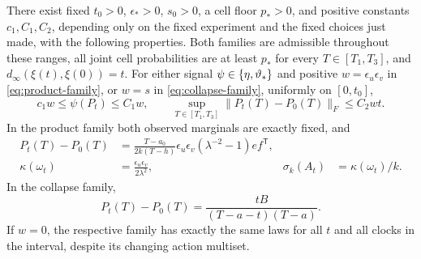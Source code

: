 \begin{lemma}\label{lem:families}
There exist fixed $t_0>0$, $\epsilon_*>0$, $s_0>0$, a cell floor
$p_*>0$, and positive constants $c_1,C_1,C_2$, depending only on the
fixed experiment and the fixed choices just made, with the following
properties. Both families are admissible throughout these ranges,
all joint cell probabilities are at least $p_*$ for every
$T\in[T_1,T_3]$, and $d_\infty(\xi(t),\xi(0))=t$.
For either signal $\psi\in\{\eta,\vartheta_*\}$ and positive
$w=\epsilon_u\epsilon_v$ in \eqref{eq:product-family}, or $w=s$
in \eqref{eq:collapse-family}, uniformly on $[0,t_0]$,
\begin{equation}\label{eq:family-constants}
 c_1w\le\psi(P_t)\le C_1w,\qquad
 \sup_{T\in[T_1,T_3]}\|P_t(T)-P_0(T)\|_F\le C_2wt.
\end{equation}
In the product family both observed marginals are exactly fixed, and
\begin{align}
 P_t(T)-P_0(T)
  &=\frac{T-a_0}{2k(T-h)}\epsilon_u\epsilon_v
                              (\lambda^{-2}-1)ef^{\mathsf T},
                                                    \label{eq:product-identity}\\
 \kappa(\omega_t)&=\frac{\epsilon_u\epsilon_v}{2\lambda^2},
       &\sigma_k(A_t)&=\kappa(\omega_t)/k.       \label{eq:product-singular}
\end{align}
In the collapse family,
\begin{equation}\label{eq:collapse-identity}
 P_t(T)-P_0(T)=\frac{tB}{(T-a-t)(T-a)}.
\end{equation}
If $w=0$, the respective family has exactly the same laws for all $t$
and all clocks in the interval, despite its changing action multiset.
\end{lemma}
